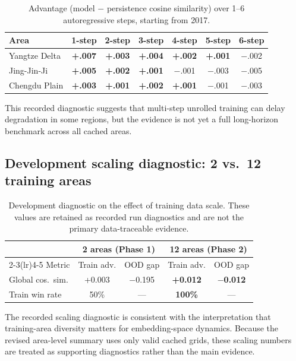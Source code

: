 \documentclass{article}
\begin{document}
\begin{table}[htbp]
\centering
\caption{Advantage (model $-$ persistence cosine similarity) over 1--6 autoregressive steps, starting from 2017.}
\label{tab:multistep}
\begin{tabular}{lcccccc}
\toprule
Area & 1-step & 2-step & 3-step & 4-step & 5-step & 6-step \\
\midrule
Yangtze Delta & \textbf{+.007} & \textbf{+.003} & \textbf{+.004} & \textbf{+.002} & \textbf{+.001} & $-$.002 \\
Jing-Jin-Ji & \textbf{+.005} & \textbf{+.002} & \textbf{+.001} & $-$.001 & $-$.003 & $-$.005 \\
Chengdu Plain & \textbf{+.003} & \textbf{+.001} & \textbf{+.002} & \textbf{+.001} & $-$.001 & $-$.003 \\
\bottomrule
\end{tabular}
\end{table}

This recorded diagnostic suggests that multi-step unrolled training can delay degradation in some regions, but the evidence is not yet a full long-horizon benchmark across all cached areas.

\subsection{Development scaling diagnostic: 2 vs.~12 training areas}
\label{sec:ablation_data}

\begin{table}[htbp]
\centering
\caption{Development diagnostic on the effect of training data scale. These values are retained as recorded run diagnostics and are not the primary data-traceable evidence.}
\label{tab:scaling}
\begin{tabular}{lcccc}
\toprule
 & \multicolumn{2}{c}{2 areas (Phase 1)} & \multicolumn{2}{c}{12 areas (Phase 2)} \\
\cmidrule(lr){2-3}\cmidrule(lr){4-5}
Metric & Train adv. & OOD gap & Train adv. & OOD gap \\
\midrule
Global cos.~sim. & +0.003 & $-$0.195 & \textbf{+0.012} & $\mathbf{-}$\textbf{0.012} \\
Train win rate & 50\% & --- & \textbf{100\%} & --- \\
\bottomrule
\end{tabular}
\end{table}

The recorded scaling diagnostic is consistent with the interpretation that training-area diversity matters for embedding-space dynamics. Because the revised area-level summary uses only valid cached grids, these scaling numbers are treated as supporting diagnostics rather than the main evidence.
\end{document}
